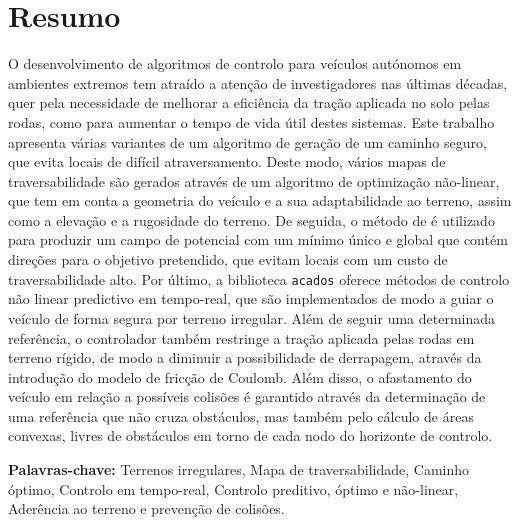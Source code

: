 
\section*{Resumo}


\noindent O desenvolvimento de algoritmos de controlo para veículos autónomos em ambientes extremos tem atraído a atenção de investigadores nas últimas décadas, quer pela necessidade de melhorar a eficiência da tração aplicada no solo pelas rodas, como para aumentar o tempo de vida útil destes sistemas. Este trabalho apresenta várias variantes de um algoritmo de geração de um caminho seguro, que evita locais de difícil atraversamento. Deste modo, vários mapas de traversabilidade são gerados através de um algoritmo de optimização não-linear, que tem em conta a geometria do veículo e a sua adaptabilidade ao terreno, assim como a elevação e a rugosidade do terreno. De seguida, o método de  é utilizado para produzir um campo de potencial com um mínimo único e global que contém direções para o objetivo pretendido, que evitam locais com um custo de traversabilidade alto. Por último, a biblioteca \texttt{acados} oferece métodos de controlo não linear predictivo em tempo-real, que são implementados de modo a guiar o veículo de forma segura por terreno irregular. Além de seguir uma determinada referência, o controlador também restringe a tração aplicada pelas rodas em terreno rígido, de modo a diminuir a possibilidade de derrapagem, através da introdução do modelo de fricção de Coulomb. Além disso, o afastamento do veículo em relação a possíveis colisões é garantido através da determinação de uma referência que não cruza obstáculos, mas também pelo cálculo de áreas convexas, livres de obstáculos em torno de cada nodo do horizonte de controlo.

\vfill

\textbf{\Large Palavras-chave:} Terrenos irregulares, Mapa de traversabilidade, Caminho óptimo, Controlo em tempo-real, Controlo preditivo, óptimo e não-linear, Aderência ao terreno e prevenção de colisões.

